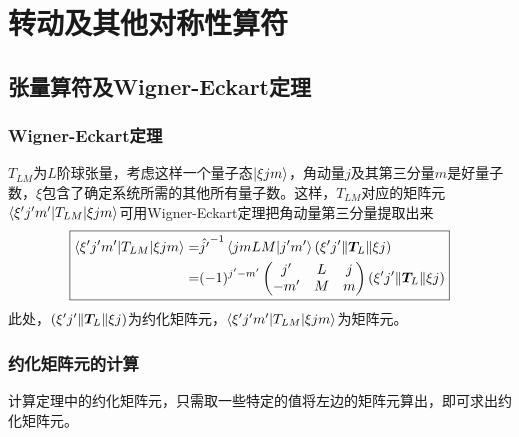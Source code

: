 \chapter{转动及其他对称性算符}

\section{张量算符及Wigner-Eckart定理}

\subsection{Wigner-Eckart定理}
$T_{LM}$为$L$阶球张量，考虑这样一个量子态$\ket{\xi j m}$，角动量$j$及其第三分量$m$是好量子数，$\xi$包含了确定系统所需的其他所有量子数。这样，$T_{LM}$对应的矩阵元$\braket{\xi^{\prime} j^{\prime} m^{\prime} | T_{LM} | \xi j m}$可用Wigner-Eckart定理把角动量第三分量提取出来
\begin{equation}
    \boxed{
    \begin{aligned}
        \braket{\xi^{\prime} j^{\prime} m^{\prime} | T_{LM} | \xi j m}
        =& \hat{j^{\prime}}^{-1}\braket{jmLM | j^{\prime} m^{\prime}}
        \left(\xi^{\prime} j^{\prime} \| \bm{T}_{L} \| \xi j \right) \\
        =& (-1)^{j^\prime - m^\prime}
        \begin{pmatrix}
            j^{\prime} & L & j \\
            -m^{\prime}& M & m
        \end{pmatrix}
        \left(\xi^{\prime} j^{\prime} \| \bm{T}_{L} \| \xi j \right)      
    \end{aligned}
    }
    \label{eq:wigner-eckart}
\end{equation}
此处，$\left(\xi^{\prime} j^{\prime} \| \bm{T}_{L} \| \xi j \right)$为约化矩阵元，$\braket{\xi^{\prime} j^{\prime} m^{\prime} | T_{LM} | \xi j m}$为矩阵元。

\subsection{约化矩阵元的计算}
计算定理中的约化矩阵元，只需取一些特定的值将左边的矩阵元算出，即可求出约化矩阵元。 


